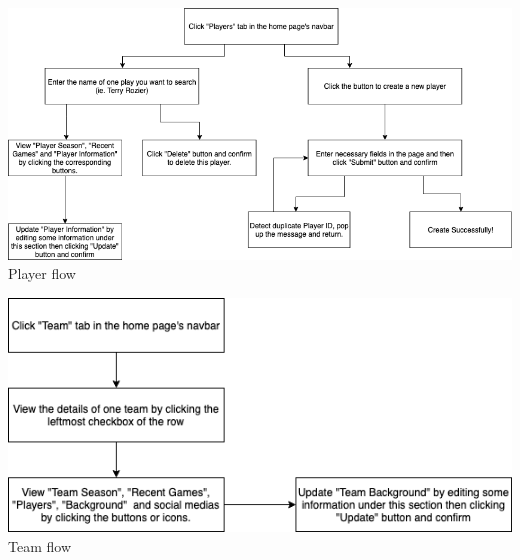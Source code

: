 \documentclass[a4paper,12pt]{article} %
\begin{document}
\bigskip
\begin{center}
\includegraphics[width=1\textwidth]{User_Flow_Player}
Player flow
\end{center}
\bigskip
\begin{center}
\includegraphics[width=1\textwidth]{User_Flow_Team}
Team flow
\end{center}
\end{document}
